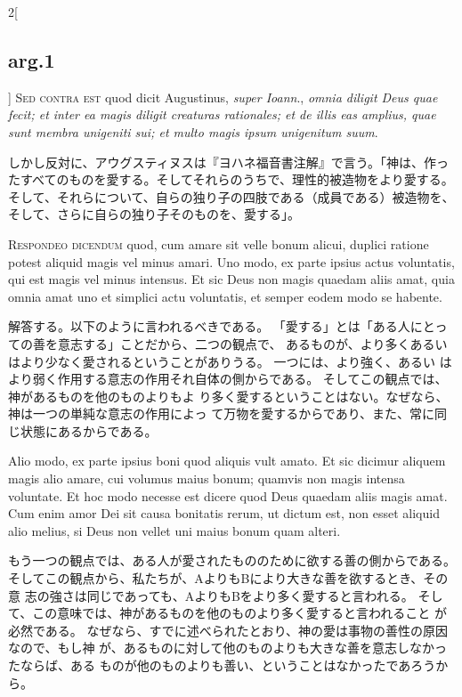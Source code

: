 \documentclass[paper=a4paper,fontsize=10pt,jafontsize=9pt,titlepage]{jlreq}
\begin{document}
\begin{paracol}{2}[\subsection{arg.1}]
{\scshape Sed contra est} quod dicit Augustinus, {\itshape super
Ioann}., {\itshape omnia diligit Deus quae fecit; et inter ea magis diligit
creaturas rationales; et de illis eas amplius, quae sunt membra
unigeniti sui; et multo magis ipsum unigenitum suum}.

\switchcolumn

しかし反対に、アウグスティヌスは『ヨハネ福音書注解』で言う。「神は、作っ
 たすべてのものを愛する。そしてそれらのうちで、理性的被造物をより愛する。
 そして、それらについて、自らの独り子の四肢である（成員である）被造物を、
 そして、さらに自らの独り子そのものを、愛する」。



{\scshape Respondeo dicendum} quod, cum amare sit velle
bonum alicui, duplici ratione potest aliquid magis vel minus amari. Uno
modo, ex parte ipsius actus voluntatis, qui est magis vel minus
intensus. Et sic Deus non magis quaedam aliis amat, quia omnia amat uno
et simplici actu voluntatis, et semper eodem modo se habente.

\switchcolumn

解答する。以下のように言われるべきである。
「愛する」とは「ある人にとっての善を意志する」ことだから、二つの観点で、
あるものが、より多くあるいはより少なく愛されるということがありうる。
一つには、より強く、あるい
 はより弱く作用する意志の作用それ自体の側からである。
そしてこの観点では、神があるものを他のものよりもよ
 り多く愛するということはない。なぜなら、神は一つの単純な意志の作用によっ
 て万物を愛するからであり、また、常に同じ状態にあるからである。

\switchcolumn*


Alio modo,
ex parte ipsius boni quod aliquis vult amato. Et sic dicimur aliquem
magis alio amare, cui volumus maius bonum; quamvis non magis intensa
voluntate. Et hoc modo necesse est dicere quod Deus quaedam aliis magis
amat. Cum enim amor Dei sit causa bonitatis rerum, ut dictum est, non
esset aliquid alio melius, si Deus non vellet uni maius bonum quam
alteri.

\switchcolumn

もう一つの観点では、ある人が愛されたもののために欲する善の側からである。
そしてこの観点から、私たちが、AよりもBにより大きな善を欲するとき、その意
 志の強さは同じであっても、AよりもBをより多く愛すると言われる。
そして、この意味では、神があるものを他のものより多く愛すると言われること
 が必然である。
なぜなら、すでに述べられたとおり、神の愛は事物の善性の原因なので、もし神
 が、あるものに対して他のものよりも大きな善を意志しなかったならば、ある
 ものが他のものよりも善い、ということはなかったであろうから。


\end{paracol}
\end{document}
